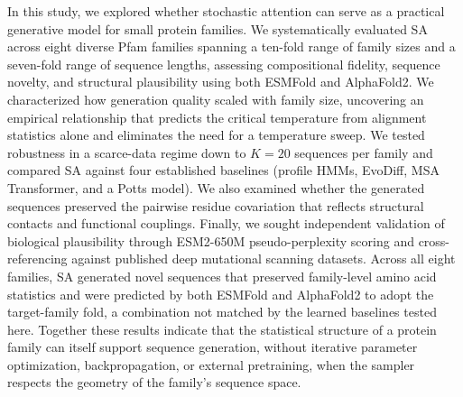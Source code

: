 In this study, we explored whether stochastic attention can serve as a practical generative model for small protein families. We systematically evaluated SA across eight diverse Pfam families spanning a ten-fold range of family sizes and a seven-fold range of sequence lengths, assessing compositional fidelity, sequence novelty, and structural plausibility using both ESMFold and AlphaFold2. We characterized how generation quality scaled with family size, uncovering an empirical relationship that predicts the critical temperature from alignment statistics alone and eliminates the need for a temperature sweep. We tested robustness in a scarce-data regime down to $K{=}20$ sequences per family and compared SA against four established baselines (profile HMMs, EvoDiff, MSA Transformer, and a Potts model). We also examined whether the generated sequences preserved the pairwise residue covariation that reflects structural contacts and functional couplings. Finally, we sought independent validation of biological plausibility through ESM2-650M pseudo-perplexity scoring and cross-referencing against published deep mutational scanning datasets. Across all eight families, SA generated novel sequences that preserved family-level amino acid statistics and were predicted by both ESMFold and AlphaFold2 to adopt the target-family fold, a combination not matched by the learned baselines tested here. Together these results indicate that the statistical structure of a protein family can itself support sequence generation, without iterative parameter optimization, backpropagation, or external pretraining, when the sampler respects the geometry of the family's sequence space.

